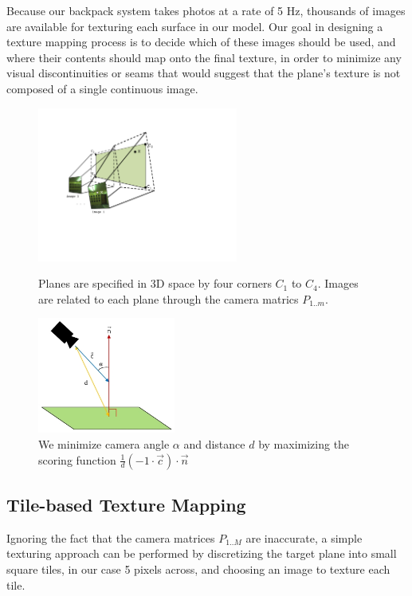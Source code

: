 \documentclass[]{spie}  %
\begin{document}
Because our backpack system takes photos at a rate of 5 Hz, thousands
of images are available for texturing each surface in our model. Our
goal in designing a texture mapping process is to decide which of
these images should be used, and where their contents should map onto
the final texture, in order to minimize any visual discontinuities or
seams that would suggest that the plane's texture is not composed of a
single continuous image.

\begin{figure}
  \begin{minipage}[b]{0.45\linewidth}
    \centering
    \includegraphics[height=2in]{Projection.pdf}
    \caption{Planes are specified in 3D space by four corners $C_1$ to
      $C_4$. Images are related to each plane through the camera
      matrics $P_{1..m}$. }
    \label{fig:projection}
  \end{minipage}
  \hspace{0.5cm}
  \begin{minipage}[b]{0.45\linewidth}
    \centering
    \includegraphics[height=1.5in]{scoringFunction.jpg}
    \caption{We minimize camera angle $\alpha$ and distance $d$ by
      maximizing the scoring function $\frac{1}{d} (-1 \cdot \vec{c})
      \cdot \vec{n}$}
    \label{fig:scoringFunction}
  \end{minipage}
\end{figure}


\subsection{Tile-based Texture Mapping}
\label{sec:tileBasedMapping}
Ignoring the fact that the camera matrices $P_{1..M}$ are inaccurate,
a simple texturing approach can be performed by discretizing the
target plane into small square tiles, in our case 5 pixels across, and
choosing an image to texture each tile.
\end{document}
